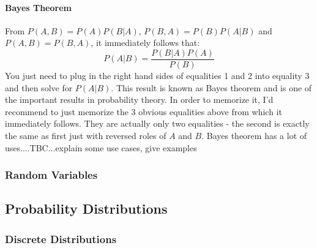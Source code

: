 





\paragraph{Bayes Theorem}
From $P(A, B) = P(A) P(B|A)$,  $P(B, A) = P(B) P(A|B)$ and $P(A, B) = P(B, A)$, it immediately follows that:
\begin{equation}
\label{Eq:BayesTheorem}
 P(A|B) = \frac{P(B|A) P(A)}{P(B)}
\end{equation}
You just need to plug in the right hand sides of equalities 1 and 2 into equality 3 and then solve for $ P(A|B)$. This result is known as Bayes theorem and is one of the important results in probability theory. In order to memorize it, I'd recommend to just memorize the 3 obvious equalities above from which it immediately follows. They are actually only two equalities - the second is exactly the same as first just with reversed roles of $A$ and $B$. Bayes theorem has a lot of uses....TBC...explain some use cases, give examples






\subsubsection{Random Variables}


\subsection{Probability Distributions}


\subsubsection{Discrete Distributions}

